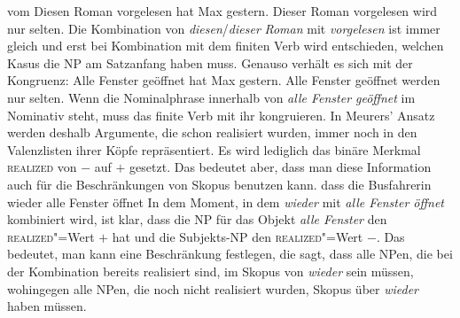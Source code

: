 vom 
\eal
\ex Diesen Roman vorgelesen hat Max gestern.
\ex Dieser Roman vorgelesen wird nur selten.
\zl
Die Kombination von \emph{diesen}/\emph{dieser} \emph{Roman} mit \emph{vorgelesen} ist immer gleich
  und erst bei Kombination mit dem finiten Verb wird entschieden, welchen Kasus die NP am Satzanfang
  haben muss. Genauso verhält es sich mit der Kongruenz:
\eal
\ex Alle Fenster geöffnet hat Max gestern.
\ex Alle Fenster geöffnet werden nur selten.
\zl
Wenn die Nominalphrase innerhalb von \emph{alle Fenster geöffnet} im Nominativ steht, muss das
finite Verb mit ihr kongruieren. In Meurers' Ansatz werden deshalb Argumente, die schon realisiert
wurden, immer noch in den Valenzlisten ihrer Köpfe repräsentiert. Es wird lediglich das binäre
Merkmal \textsc{realized} von $-$ auf $+$ gesetzt. Das bedeutet aber, dass man diese Information
auch für die Beschränkungen von Skopus benutzen kann.
\ea
dass die Busfahrerin wieder alle Fenster öffnet
\z
In dem Moment, in dem \emph{wieder} mit \emph{alle Fenster öffnet} kombiniert wird, ist klar, dass
die NP für das Objekt \emph{alle Fenster} den \textsc{realized}"=Wert $+$ hat und die Subjekts-NP
den \textsc{realized}"=Wert $-$. Das bedeutet, man kann eine Beschränkung festlegen, die sagt, dass
alle NPen, die bei der Kombination bereits realisiert sind, im Skopus von \emph{wieder} sein müssen,
wohingegen alle NPen, die noch nicht realisiert wurden, Skopus über \emph{wieder} haben müssen.

